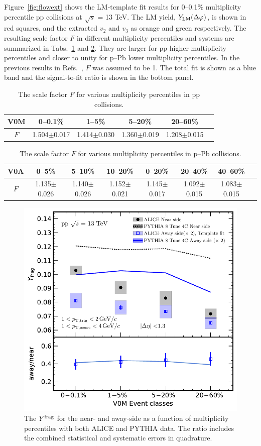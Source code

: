 Figure~\ref{fig:flowext} shows the LM-template fit results for 0--0.1\% multiplicity percentile pp collisions at $\sqrt{s}$ = 13 TeV. The LM yield,  $Y_{\rm{LM}}(\Delta\varphi)$, is shown in red squares, and the extracted $v_{2}$ and $v_{3}$ as orange and green respectively. The resulting scale factor $F$ in different multiplicity percentiles and systems are summarized in Tabs.~\ref{tab:Fpp} and \ref{tab:Fpb}. They are larger for pp higher multiplicity percentiles and closer to unity for p--Pb lower multiplicity percentiles. In the previous results in Refs.~\cite{ALICE:2012eyl,ALICE:2013snk}, $F$ was assumed to be 1. The total fit is shown as a blue band and the signal-to-fit ratio is shown in the bottom panel. 
\begin{table}[h!]
\caption{The scale factor $F$ for various multiplicity percentiles in pp collisions.}
\centering
\begin{tabular}{|c|cccc|c}
\hline
 V0M& 0--0.1\% & 1--5\% & 5--20\% & 20--60\% \\ 
 \hline
 $F$ & 1.504$\pm$0.017 & 1.414$\pm$0.030 & 1.360$\pm$0.019 & 1.208$\pm$0.015 \\  
 \hline
 \end{tabular}
 \label{tab:Fpp}
 
\end{table}

\begin{table}[h!]
\caption{The scale factor $F$ for various multiplicity percentiles in p--Pb collisions.}
\centering
\begin{tabular}{|c|cccccc|c}
 \hline
 V0A& 0--5\% & 5--10\% & 10--20\% & 0--20\% & 20--40\% & 40--60\% \\ 
 \hline
 $F$& 1.135$\pm$0.026 & 1.140$\pm$0.026 & 1.152$\pm$0.021 & 1.145$\pm$0.017 &1.092$\pm$0.015 & 1.083$\pm$0.015 \\  
 \hline
\end{tabular}
\label{tab:Fpb}
\end{table}

\begin{figure}[h!]
	\centering
	\includegraphics[width=0.6 \textwidth]{figures/Fig5_Plot_v2Mult.pdf} 
	\caption{The $Y^{\rm{frag}}$ for the near- and away-side as a function of multiplicity percentiles with both ALICE and PYTHIA data. The ratio includes the combined statistical and systematic errors in quadrature.}
	\label{fig:Ymult}
\end{figure}

